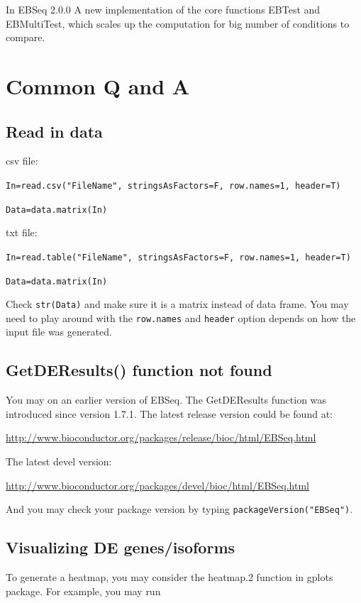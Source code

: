 \documentclass{article}
\begin{document}
In EBSeq 2.0.0 A new implementation of the core functions EBTest and EBMultiTest, which scales up the computation for big number of conditions to compare. 

\section{Common Q and A}
\subsection{Read in data}

csv file:

\verb+In=read.csv("FileName", stringsAsFactors=F, row.names=1, header=T)+

\verb+Data=data.matrix(In)+

\noindent txt file:

\verb+In=read.table("FileName", stringsAsFactors=F, row.names=1, header=T)+

\verb+Data=data.matrix(In)+

\noindent Check \verb+str(Data)+ and make sure it is a matrix instead of data frame. You may need to play around with the \verb+row.names+ 
and \verb+header+ option depends on how the input file was generated.



\subsection{GetDEResults() function not found}

You may on an earlier version of EBSeq. The GetDEResults function
was introduced since version 1.7.1.
The latest release version could be found at:

\url{http://www.bioconductor.org/packages/release/bioc/html/EBSeq.html}

\noindent The latest devel version:

\url{http://www.bioconductor.org/packages/devel/bioc/html/EBSeq.html}

\noindent And you may check your package version by typing \verb+packageVersion("EBSeq")+.


\subsection{Visualizing DE genes/isoforms}

To generate a heatmap, you may consider the heatmap.2 function in gplots package.
For example, you may run
\end{document}
